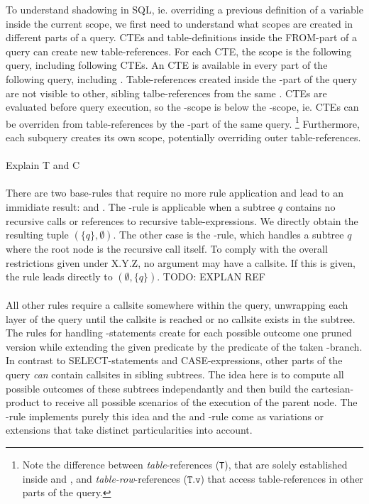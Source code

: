 To understand shadowing in SQL, ie. overriding a previous definition of a variable inside the current scope, we first need to understand what scopes are created in different parts of a query. CTEs and table-definitions inside the FROM-part of a query can create new table-references. For each CTE, the scope is the following query, including following CTEs. An CTE is available in every part of the following query, including \FROM. Table-references created inside the \FROM-part of the query are not visible to other, sibling talbe-references from the same \FROM. CTEs are evaluated before query execution, so the \FROM-scope is below the \WITH-scope, ie. CTEs can be overriden from table-references by the \FROM-part of the same query. \footnote{Note the difference between \textit{table}-references (\texttt{T}), that are solely established inside \FROM and \WITH, and \textit{table-row}-references ($\texttt{T.v}$) that access table-references in other parts of the query.} Furthermore, each subquery creates its own scope, potentially overriding outer table-references.
\\\\
Explain T and C
\\\\
There are two base-rules that require no more rule application and lead to an immidiate result: \RBASE and \RREC. The \RBASE-rule is applicable when a subtree $q$ contains no recursive calls or references to recursive table-expressions. We directly obtain the resulting tuple $(\{q\}, \emptyset)$. The other case is the \RREC-rule, which handles a subtree $q$ where the root node is the recursive call itself. To comply with the overall restrictions given under X.Y.Z, no argument may have a callsite. If this is given, the rule leads directly to $(\emptyset, \{q\})$. TODO: EXPLAN REF
\\\\
All other rules require a callsite somewhere within the query, unwrapping each layer of the query until the callsite is reached or no callsite exists in the subtree. The rules for handling \CASE-statements create for each possible outcome one pruned version while extending the given predicate by the predicate of the taken \WHEN-branch. In contrast to SELECT-statements and CASE-expressions, other parts of the query \textit{can} contain callsites in sibling subtrees. The idea here is to compute all possible outcomes of these subtrees independantly and then build the cartesian-product to receive all possible scenarios of the execution of the parent node. The \REXPR-rule implements purely this idea and the \RCTE and \RFROM-rule come as variations or extensions that take distinct particularities into account.
